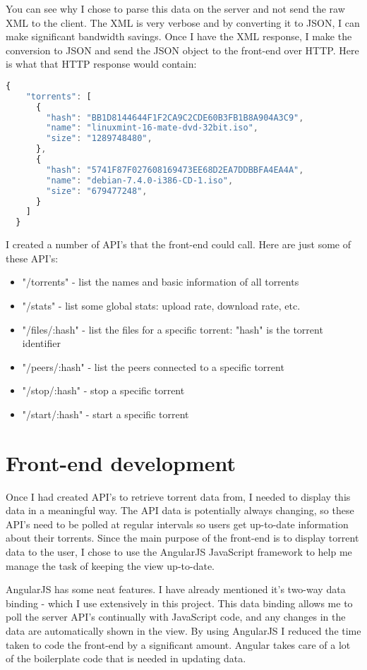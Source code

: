 You can see why I chose to parse this data on the server and not send the raw XML to the client. The XML is very verbose and by converting it to JSON, I can make significant bandwidth savings. Once I have the XML response, I make the conversion to JSON and send the JSON object to the front-end over HTTP. Here is what that HTTP response would contain:
\vspace{10px}
\begin{lstlisting}[caption=XML-RPC response converted to JSON, language=JavaScript]
  {
    "torrents": [
      {
        "hash": "BB1D8144644F1F2CA9C2CDE60B3FB1B8A904A3C9",
        "name": "linuxmint-16-mate-dvd-32bit.iso",
        "size": "1289748480",
      },
      {
        "hash": "5741F87F027608169473EE68D2EA7DDBBFA4EA4A",
        "name": "debian-7.4.0-i386-CD-1.iso",
        "size": "679477248",
      }
    ]
  }
\end{lstlisting}

I created a number of API's that the front-end could call. Here are just some of these API's:

\begin{itemize}
	\item "/torrents" - list the names and basic information of all torrents
	\item "/stats" - list some global stats: upload rate, download rate, etc.
	\item "/files/:hash" - list the files for a specific torrent: "hash" is the torrent identifier
	\item "/peers/:hash" - list the peers connected to a specific torrent
	\item "/stop/:hash" - stop a specific torrent
	\item "/start/:hash" - start a specific torrent
\end{itemize}


\section{Front-end development}
Once I had created API's to retrieve torrent data from, I needed to display this data in a meaningful way. The API data is potentially always changing, so these API's need to be polled at regular intervals so users get up-to-date information about their torrents. Since the main purpose of the front-end is to display torrent data to the user, I chose to use the AngularJS JavaScript framework to help me manage the task of keeping the view up-to-date. 

AngularJS has some neat features. I have already mentioned it's two-way data binding - which I use extensively in this project. This data binding allows me to poll the server API's continually with JavaScript code, and any changes in the data are automatically shown in the view. By using AngularJS I reduced the time taken to code the front-end by a significant amount. Angular takes care of a lot of the boilerplate code that is needed in updating data.

